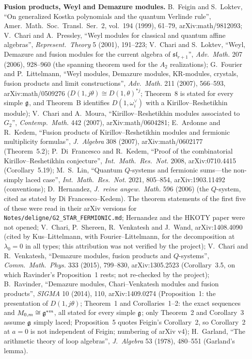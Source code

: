 \textbf{Fusion products, Weyl and Demazure modules.} B.~Feigin and S.~Loktev, ``On generalized Kostka polynomials and the quantum Verlinde
rule'', Amer.\ Math.\ Soc.\ Transl.\ Ser.~2, vol.~194 (1999), 61--79, arXiv:math/9812093; V.~Chari and A.~Pressley, ``Weyl modules for classical
and quantum affine algebras'', \emph{Represent.\ Theory} 5 (2001), 191--223; V.~Chari and S.~Loktev, ``Weyl, Demazure and fusion modules for the
current algebra of $\mathfrak{sl}_{r+1}$'', \emph{Adv.\ Math.} 207 (2006), 928--960 (the spanning theorem used for the $A_2$ realizations);
G.~Fourier and P.~Littelmann, ``Weyl modules, Demazure modules, KR-modules, crystals, fusion products and limit constructions'',
\emph{Adv.\ Math.} 211 (2007), 566--593, arXiv:math/0509276 ($D(1,j\theta)\cong D(1,\theta)^{*j}$; Theorem~8 is stated for every
simple $\mathfrak g$, and Theorem~B identifies $D(1,\omega_i^\vee)$ with a Kirillov--Reshetikhin module);
V.~Chari and A.~Moura, ``Kirillov--Reshetikhin modules associated to $G_2$'', \emph{Contemp.\ Math.} 442 (2007), arXiv:math/0604281;
E.~Ardonne and R.~Kedem, ``Fusion products of Kirillov--Reshetikhin modules and fermionic multiplicity formulas'', \emph{J.\ Algebra}
308 (2007), arXiv:math/0602177 (Theorem~5.2); P.~Di~Francesco and R.~Kedem, ``Proof of the combinatorial Kirillov--Reshetikhin
conjecture'', \emph{Int.\ Math.\ Res.\ Not.} 2008, arXiv:0710.4415 (Corollary~5.19); M.~S.~Lin, ``Quantum $Q$-systems and fermionic
sums---the non-simply laced case'', \emph{Int.\ Math.\ Res.\ Not.} 2021, 805--854, arXiv:1903.11492 (conventions); D.~Hernandez,
\emph{J.\ reine angew.\ Math.} 596 (2006) (the $Q$-system, cited as stated by Di Francesco--Kedem). The theorem statements of the first five of these were read in their arXiv
versions for \texttt{Notes/deligne/G2\_STAR\_FERMIONIC.md}; Hernandez and the HKOTY paper were not opened; V.~Chari, P.~Shereen,
R.~Venkatesh and J.~Wand, arXiv:1408.4090 (cited by Kus--Littelmann, with Fourier--Littelmann, for the decomposition at
$\lambda_0=0$ in all types; this attribution was not verified by the project); V.~Chari and R.~Venkatesh, ``Demazure modules, fusion products and
$Q$-systems'', \emph{Comm.\ Math.\ Phys.} 333 (2015), 799--830, arXiv:1305.2523 (Corollary~3.5, on which Ravinder's Proposition~1
rests; not re-checked by the project); B.~Ravinder, ``Demazure modules, Chari--Venkatesh modules and
fusion products'', \emph{SIGMA} 10 (2014), 110, arXiv:1409.0274 (Proposition~1: the presentation of $D(1,j\theta)$; Theorem~1 and
Corollaries~1--2: the exact sequences and $M_{0,m}\cong\mathfrak g^{*m}$, all stated for every simple $\mathfrak g$; only
Theorem~2 and Corollary~3 assume $\mathfrak g$ simply laced; Proposition~5 quotes Feigin's Corollary~2, so Corollary~2 at $a=0$ is
not independent of Feigin; numbering of arXiv v4); H.~Garland, ``The arithmetic theory of loop algebras'',
\emph{J.\ Algebra} 53 (1978), 480--551 (Garland's lemma).


